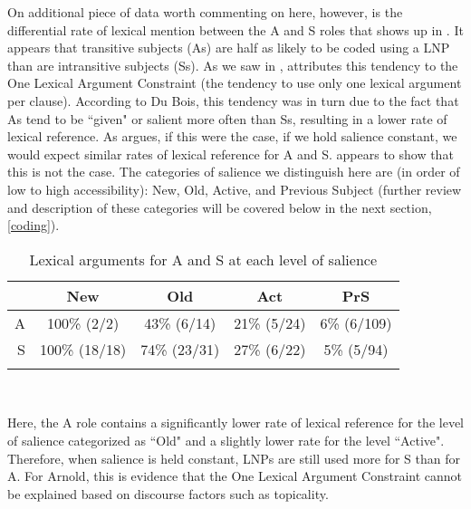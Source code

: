 On additional piece of data worth commenting on here, however, is the differential rate of lexical mention between the A and S roles that shows up in . It appears that transitive subjects (As) are half as likely to be coded using a LNP than are intransitive subjects (Ss). As we saw in , \citet{dubois1987} attributes this tendency to the One Lexical Argument Constraint (the tendency to use only one lexical argument per clause). According to Du Bois, this tendency was in turn due to the fact that As tend to be ``given" or salient more often than Ss, resulting in a lower rate of lexical reference. As \citet[237]{arnold2003} argues, if this were the case, if we hold salience constant, we would expect similar rates of lexical reference for A and S.  appears to show that this is not the case. The categories of salience we distinguish here are (in order of low to high accessibility): New, Old, Active, and Previous Subject (further review and description of these categories will be covered below in the next section, \ref{coding}). 

\begin{table} 

\caption{{Lexical arguments for A and S at each level of salience}}
\begin{tabular}{ r  c  c  c  c }
\lsptoprule
 & New & Old & Act & PrS \\

\midrule
 A & 100{\%} (2/2) & 43{\%} (6/14) & 21{\%} (5/24)  & 6{\%} (6/109) \\

 
S & 100{\%} (18/18) & 74{\%} (23/31) & 27{\%} (6/22) & 5{\%} (5/94) \\

\lspbottomrule
\end{tabular}\\
\label{ASsalience}

\end{table}
Here, the A role contains a significantly lower rate of lexical reference for the level of salience categorized as ``Old" and a slightly lower rate for the level ``Active". Therefore, when salience is held constant, LNPs are still used more for S than for A. For Arnold, this is evidence that the One Lexical Argument Constraint cannot be explained based on discourse factors such as topicality.

